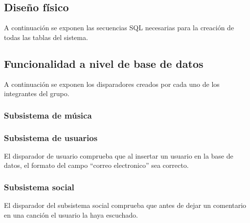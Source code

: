 \subsection{Diseño físico}

A continuación se exponen las secuencias SQL necesarias para la creación de todas las tablas del sistema.

 

\subsection{Funcionalidad a nivel de base de datos}

A continuación se exponen los disparadores creados por cada uno de los integrantes del grupo.

\subsubsection{Subsistema de música}

 


\subsubsection{Subsistema de usuarios}

El disparador de usuario comprueba que al insertar un usuario en la base de datos, el formato del campo ``correo electronico'' sea correcto.
 

\subsubsection{Subsistema social}
El disparador del subsistema social comprueba que antes de dejar un comentario en una canción el usuario la haya escuchado.
 
